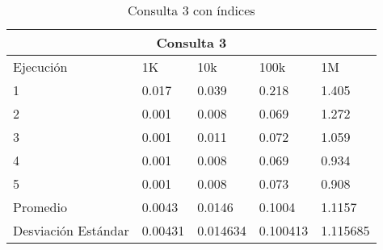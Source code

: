 \begin{table}%
\begin{center}%
\setlength{\tabcolsep}{0.3in}%
\begin{tabular}{|l|l|l|l|l|}%
\hline%
\multicolumn{5}{|c|}{Consulta 3}\\%
\hline%
Ejecución&1K&10k&100k&1M\\%
\hline%
1&0.017&0.039&0.218&1.405\\%
\hline%
2&0.001&0.008&0.069&1.272\\%
\hline%
3&0.001&0.011&0.072&1.059\\%
\hline%
4&0.001&0.008&0.069&0.934\\%
\hline%
5&0.001&0.008&0.073&0.908\\%
\hline%
Promedio&0.0043&0.0146&0.1004&1.1157\\%
\hline%
Desviación Estándar&0.00431&0.014634&0.100413&1.115685\\%
\hline%
\end{tabular}%
\end{center}%
\caption{Consulta 3 con índices}%
\end{table}